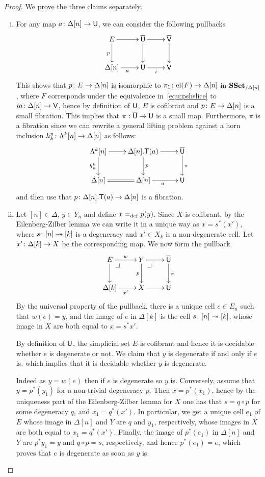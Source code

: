 \documentclass[reqno,10pt,a4paper,oneside,draft]{amsart}
\begin{document}
\begin{proof} We prove the three claims separately.
\begin{enumerate}[(i)] 
\item For any map $a \colon \Delta[n] \rightarrow \mathsf{U}$, we can consider the following pullbacks
\[
\xymatrix{
E \ar[r] \ar[d]_p  & \UU \ar[d] \ar[r]  & \VV \ar[d] \\
\Delta[n] \ar[r]_{a} & \U \ar[r]_{i} & \V }
\]
This shows that $p \colon E \rightarrow \Delta[n]$ is isomorphic to $\pi_1 \colon \mathrm{el}(F) \rightarrow \Delta[n]$ in $\mathbf{SSet}_{/ \Delta[n]}$, where $F$ corresponds under the equivalence in~\eqref{equ:pshslice} to 
$i a \colon \Delta[n] \rightarrow \mathsf{V}$, hence by definition of $\mathsf{U}$, $E$ is cofibrant and $p \colon E \rightarrow \Delta[n]$ is a small fibration. This implies that $\pi:\overline{\mathsf{U}} \rightarrow \mathsf{U}$ is a small map. Furthermore, $\pi$ is a fibration
since we can rewrite a general lifting problem against a horn inclusion $h^n_k \colon \Lambda^k[n] \rightarrow \Delta[n]$ as follows:
\[
\xymatrix{
\Lambda^k[n] \ar[r] \ar[d]_{h^k_n} & \Delta[n]. \mathsf{T}(a)  \ar[d]^{p} \ar[r] & \UU \ar[d]^\pi \\
\Delta[n] \ar@{=}[r]  & \Delta[n] \ar[r]_a & \U  }
\]
and then use that $p \colon \Delta[n]. \mathsf{T}(a)  \to \Delta[n]$ is a fibration.
\item  Let $[n] \in \Delta$, $y \in Y_n$ and define $x =_{\operatorname{def}} p(y)$. Since $X$ is cofibrant, by the Eilenberg-Zilber lemma we can write it in a unique way as $x=s^*(x')$, where $s \colon [n] \twoheadrightarrow [k]$ is a degeneracy and 
$x' \in X_k$ is a non-degenerate cell. Let $x' \colon \Delta[k] \rightarrow X$ be the corresponding map. We now form the pullback
\[
\xymatrix{
E \ar[r]^w \ar[d] \drpullback & Y \ar[r] \ar[d]_{p} \drpullback & \UU \ar[d]^\pi \\
\Delta[k] \ar[r]_{x'} & X \ar[r] & \U }
\]
By the universal property of the pullback, there is a unique cell $e \in E_n$ such that $w(e)=y$, and the image of $e$ in $\Delta[k]$ is the cell $s \colon [n] \twoheadrightarrow [k]$, whose image in $X$ are both equal to $x=s^* x'$.

By definition of $\mathsf{U}$, the simplicial set $E$ is cofibrant and hence it is decidable whether $e$ is degenerate or not. We claim that $y$ is degenerate if and only if $e$ is, which implies that it is decidable whether $y$ is degenerate.

Indeed as $y = w(e)$ then if $e$ is degenerate so $y$ is. Conversely, assume that $y=p^*(y_1)$ for a non-trivial degeneracy $p$. Then $x=p^*(x_1)$, hence by the uniqueness part of the Eilenberg-Zilber lemma for $X$ one has that $s=q \circ p$ for some degeneracy $q$, and $x_1 = q^*(x')$. In particular, we get a unique cell $e_1$ of $E$ whose image in $\Delta[n]$ and $Y$ are  $q$ and $y_1$, respectively, whose images in $X$ are both equal to $x_1=q^*(x')$. Finally, the image of $p^*(e_1)$ in $\Delta[n]$ and~$Y$ are  $p^* y_1 =y$ and $q \circ p =s$, respectively, and hence $p^*(e_1) =e$, which proves that $e$ is degenerate as soon as $y$ is.




\end{enumerate}
\end{proof}
\end{document}
